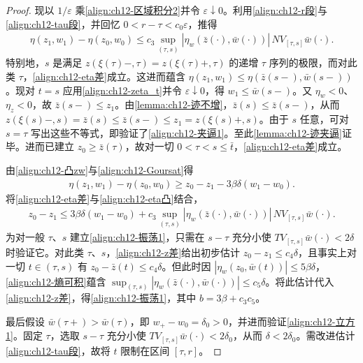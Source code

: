 \documentclass[../../main.tex]{subfiles}
\begin{document}
\begin{proof}
现以 $1/\varepsilon$ 乘\eqref{align:ch12-区域积分2}并令 $\varepsilon\downarrow0$。利用\eqref{align:ch12-r段}与\eqref{align:ch12-tau段}，并回忆 $0<r-\tau<c_0\varepsilon$，推得
\begin{align}
\eta(z_1,w_1)-\eta(z_0,w_0)\leqslant c_3\sup_{(\tau,s)}|\eta_w(\bar z(\cdot),\bar w(\cdot))|\,NV_{[\tau,s]}\bar w(\cdot).
\label{align:ch12-eta差}
\end{align}
特别地，$s$ 是满足 $z(\xi(\tau)-,\tau)=z(\xi(\tau)+,\tau)$ 的递增 $\tau$ 序列的极限，而对此类 $\tau$，\eqref{align:ch12-eta差}成立。这进而蕴含 $\eta(z_1,w_1)\leqslant\eta(\bar z(s-),\bar w(s-))$。现对 $t=s$ 应用\eqref{align:ch12-zeta_t}并令 $\varepsilon\downarrow0$，得 $w_1\leqslant\bar w(s-)$。又 $\eta_w<0$、$\eta_z<0$，故 $\bar z(s-)\leqslant z_1$。由\cref{lemma:ch12-迹不增}，$\bar z(s)\leqslant\bar z(s-)$，从而 $z(\xi(s)-,s)=\bar z(s)\leqslant\bar z(s-)\leqslant z_1=z(\xi(s)+,s)$。由于 $s$ 任意，可对 $s=\tau$ 写出这些不等式，即验证了\eqref{align:ch12-夹逼1}。至此\cref{lemma:ch12-迹夹逼}证毕。进而已建立 $z_0\geqslant\bar z(\tau)$，故对一切 $0<\tau<s\leqslant\bar t$，\eqref{align:ch12-eta差}成立。

由\eqref{align:ch12-凸zw}与\eqref{align:ch12-Goursat}得
\begin{align}
\eta(z_1,w_1)-\eta(z_0,w_0)\geqslant z_0-z_1-3\beta\delta(w_1-w_0).
\label{align:ch12-eta凸}
\end{align}
将\eqref{align:ch12-eta差}与\eqref{align:ch12-eta凸}结合，
\begin{align}
z_0-z_1\leqslant 3\beta\delta(w_1-w_0)+c_3\sup_{(\tau,s)}|\eta_w(\bar z(\cdot),\bar w(\cdot))|\,NV_{[\tau,s]}\bar w(\cdot).
\label{align:ch12-z差}
\end{align}
为对一般 $\tau$、$s$ 建立\eqref{align:ch12-振荡1}，只需在 $s-\tau$ 充分小使 $TV_{[\tau,s]}\bar w(\cdot)<2\delta$ 时验证它。对此类 $\tau$、$s$，\eqref{align:ch12-z差}给出初步估计 $z_0-z_1\leqslant c_4\delta$，且事实上对一切 $t\in(\tau,s)$ 有 $z_0-\bar z(t)\leqslant c_4\delta$。但此时因 $|\eta_w(z_0,\bar w(t))|\leqslant5\beta\delta$，\eqref{align:ch12-熵可积}蕴含 $\sup_{(\tau,s)}|\eta_w(\bar z(\cdot),\bar w(\cdot))|\leqslant c_5\delta$。将此估计代入\eqref{align:ch12-z差}，得\eqref{align:ch12-振荡1}，其中 $b=3\beta+c_3c_5$。

最后假设 $\bar w(\tau+)>\bar w(\tau)$，即 $w_+-w_0=\delta_0>0$，并进而验证\eqref{align:ch12-立方1}。固定 $\tau$，选取 $s-\tau$ 充分小使 $TV_{[\tau,s]}\bar w(\cdot)<2\delta_0$，从而 $\delta<2\delta_0$。需改进估计\eqref{align:ch12-tau段}，故将 $t$ 限制在区间 $[\tau,r]$。


\end{proof}
\end{document}
